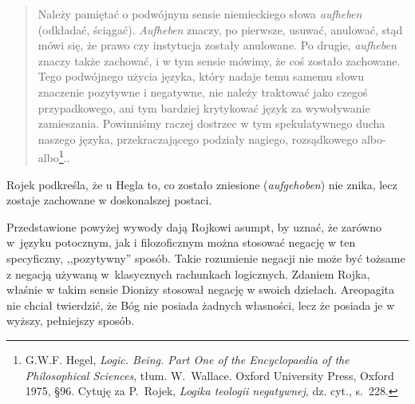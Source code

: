 \begin{quote}
    Należy pamiętać o podwójnym sensie niemieckiego słowa \textit{aufheben}
(odkładać, ściągać). \textit{Aufheben} znaczy, po pierwsze, usuwać, anulować,
stąd mówi się, że prawo czy instytucja zostały anulowane. Po drugie,
\textit{aufheben} znaczy także zachować, i w tym sensie mówimy, że coś zostało
zachowane. Tego podwójnego użycia języka, który nadaje temu samemu
słowu znaczenie pozytywne i negatywne, nie należy traktować jako czegoś
przypadkowego, ani tym bardziej krytykować język za wywoływanie
zamieszania. Powinniśmy raczej dostrzec w tym spekulatywnego ducha
naszego języka, przekraczającego podziały nagiego, rozsądkowego
albo-albo\footnote{G.W.F. Hegel, \textit{Logic. Being. Part One of the
Encyclopaedia of the Philosophical Sciences}, tłum. W.~Wallace. Oxford
University Press, Oxford 1975, §96. Cytuję za P.~Rojek, \textit{Logika teologii negatywnej}, dz. cyt.,
s.~228.}..
\end{quote}
Rojek podkreśla, że u Hegla to, co zostało zniesione
(\textit{aufgehoben}) nie znika, lecz zostaje zachowane w doskonalszej
postaci.

Przedstawione powyżej wywody dają Rojkowi asumpt, by uznać, że zarówno w~języku
potocznym, jak i filozoficznym można stosować negację w ten
specyficzny, ,,pozytywny'' sposób. Takie rozumienie negacji nie może być
tożsame z negacją używaną w~klasycznych rachunkach logicznych. Zdaniem
Rojka, właśnie w takim sensie Dionizy stosował negację w swoich
dziełach. Areopagita nie chciał twierdzić, że Bóg nie posiada żadnych
własności, lecz że posiada je w wyższy, pełniejszy sposób.

